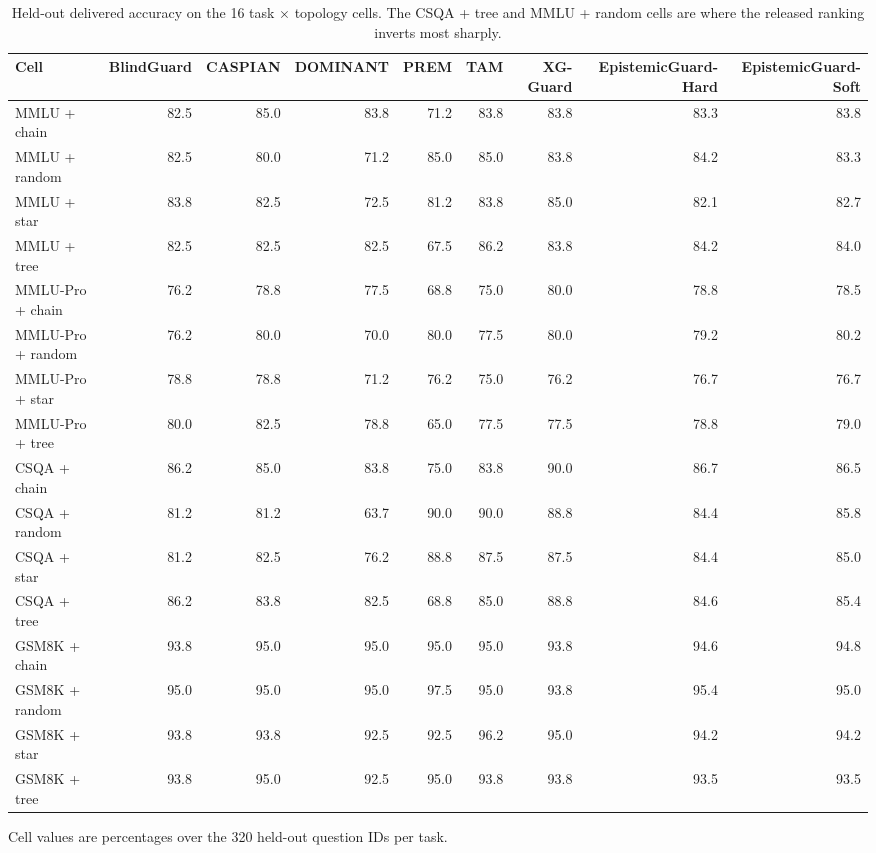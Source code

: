 \begin{table}[htbp]
\centering
\small
\caption{Held-out delivered accuracy on the 16 task $\times$ topology cells. The CSQA + tree and MMLU + random cells are where the released ranking inverts most sharply.}
\label{tab:cells}
\begin{tabular}{lrrrrrrrr}
\toprule
Cell & BlindGuard & CASPIAN & DOMINANT & PREM & TAM & XG-Guard & EpistemicGuard-Hard & EpistemicGuard-Soft \\
\midrule
MMLU + chain & 82.5 & 85.0 & 83.8 & 71.2 & 83.8 & 83.8 & 83.3 & 83.8 \\
MMLU + random & 82.5 & 80.0 & 71.2 & 85.0 & 85.0 & 83.8 & 84.2 & 83.3 \\
MMLU + star & 83.8 & 82.5 & 72.5 & 81.2 & 83.8 & 85.0 & 82.1 & 82.7 \\
MMLU + tree & 82.5 & 82.5 & 82.5 & 67.5 & 86.2 & 83.8 & 84.2 & 84.0 \\
MMLU-Pro + chain & 76.2 & 78.8 & 77.5 & 68.8 & 75.0 & 80.0 & 78.8 & 78.5 \\
MMLU-Pro + random & 76.2 & 80.0 & 70.0 & 80.0 & 77.5 & 80.0 & 79.2 & 80.2 \\
MMLU-Pro + star & 78.8 & 78.8 & 71.2 & 76.2 & 75.0 & 76.2 & 76.7 & 76.7 \\
MMLU-Pro + tree & 80.0 & 82.5 & 78.8 & 65.0 & 77.5 & 77.5 & 78.8 & 79.0 \\
CSQA + chain & 86.2 & 85.0 & 83.8 & 75.0 & 83.8 & 90.0 & 86.7 & 86.5 \\
CSQA + random & 81.2 & 81.2 & 63.7 & 90.0 & 90.0 & 88.8 & 84.4 & 85.8 \\
CSQA + star & 81.2 & 82.5 & 76.2 & 88.8 & 87.5 & 87.5 & 84.4 & 85.0 \\
CSQA + tree & 86.2 & 83.8 & 82.5 & 68.8 & 85.0 & 88.8 & 84.6 & 85.4 \\
GSM8K + chain & 93.8 & 95.0 & 95.0 & 95.0 & 95.0 & 93.8 & 94.6 & 94.8 \\
GSM8K + random & 95.0 & 95.0 & 95.0 & 97.5 & 95.0 & 93.8 & 95.4 & 95.0 \\
GSM8K + star & 93.8 & 93.8 & 92.5 & 92.5 & 96.2 & 95.0 & 94.2 & 94.2 \\
GSM8K + tree & 93.8 & 95.0 & 92.5 & 95.0 & 93.8 & 93.8 & 93.5 & 93.5 \\
\bottomrule
\end{tabular}
\par\smallskip\footnotesize Cell values are percentages over the 320 held-out question IDs per task.
\end{table}

